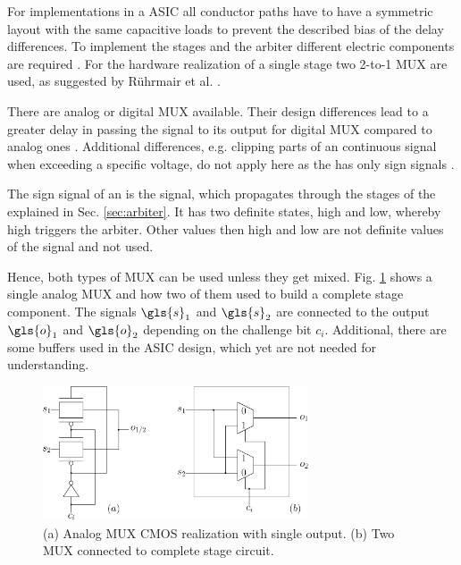 For \apuf implementations in a \ac{ASIC} all conductor paths have to have a symmetric layout with the same capacitive loads to prevent the described bias of the delay differences.
To implement the stages and the arbiter different electric components are required \cite{Maes2012ExperimentalCMOS}. %
For the hardware realization of a single stage two 2-to-1 \ac{MUX} are used, as suggested by Rührmair et al. \cite{Ruhrmair2013PUFData, Lee2004AApplications}.%

There are analog or digital \ac{MUX} available. %
Their design differences lead to a greater delay in passing the signal to its output for digital \ac{MUX} compared to analog ones \cite{2016MultiplexerWikipedia}.
Additional differences, e.g. clipping parts of an continuous signal when exceeding a specific voltage, do not apply here as the \apuf has only sign signals \cite{Semiconductor2002BasicComparison}. %

The sign signal of an \apuf is the signal, which propagates through the stages of the \apuf explained in Sec. \ref{sec:arbiter}.
It has two definite states, high and low, whereby high triggers the arbiter.
Other values then high and low are not definite values of the signal and not used.

Hence, both types of \ac{MUX} can be used unless they get mixed.
Fig. \ref{fig:multiplexer} shows a single analog \ac{MUX} and how two of them used to build a complete stage component. %
The signals $\gls{s}_1$ and $\gls{s}_2$ are connected to the output $\gls{o}_1$ and $\gls{o}_2$ depending on the challenge bit $c_i$.
Additional, there are some buffers used in the \ac{ASIC} design, which yet are not needed for understanding.

\begin{figure}[ht]
\centering
\includegraphics[width=0.70\textwidth]{images/stage_circuit.eps}
\caption[Analog \acs{MUX} and stage circuit]{(a) Analog \ac{MUX} \ac{CMOS} realization with single output.
(b) Two \acs{MUX} connected to complete stage circuit.}
\label{fig:multiplexer}
\end{figure}

